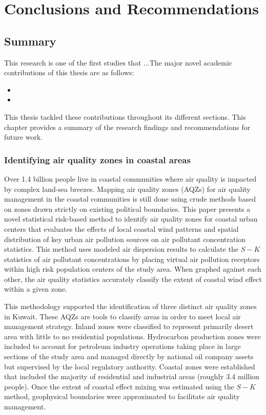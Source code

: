 \chapter{Conclusions and Recommendations}

\section{Summary}

This research is one of the first studies that ...The major novel academic contributions of this thesis are as follows:

\begin{itemize}
\item 
\item 
\end{itemize}

This thesis tackled these contributions throughout its different sections. This chapter provides a summary of the research findings and recommendations for future work.


\subsection{Identifying air quality zones in coastal areas}

Over 1.4 billion people live in coastal communities where air quality is impacted by complex land-sea breezes.  Mapping air quality zones (AQZs) for air quality management in the coastal communities is still done using crude methods based on zones drawn strictly on existing political boundaries. This paper presents a novel statistical risk-based method to identify air quality zones for coastal urban centers that evaluates the effects of local coastal wind patterns and spatial distribution of key urban air pollution sources on air pollutant concentration statistics.  This method uses modeled air dispersion results to calculate the $S-K$ statistics of air pollutant concentrations by placing virtual air pollution receptors within high risk population centers of the study area.  When graphed against each other, the air quality statistics accurately classify the extent of coastal wind effect within a given zone.
 
This methodology supported the identification of three distinct air quality zones in Kuwait.  These AQZs are tools to classify areas in order to meet local air management strategy.  Inland zones were classified to represent primarily desert area with little to no residential populations.  Hydrocarbon production zones were included to account for petroleum industry operations taking place in large sections of the study area and managed directly by national oil company assets but supervised by the local regulatory authority.  Coastal zones were established that included the majority of residential and industrial areas (roughly 3.4 million people).  Once the extent of coastal effect mixing was estimated using the $S-K$ method, geophysical boundaries were approximated to facilitate air quality management. 

